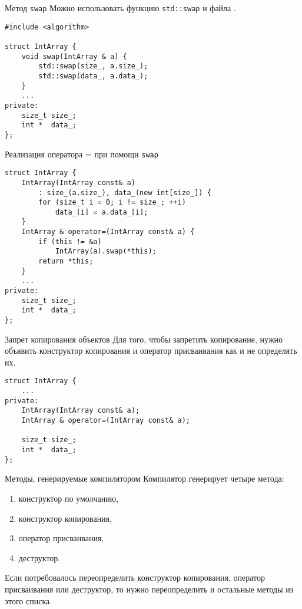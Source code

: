 \documentclass{beamer}
\begin{document}
\begin{frame}[fragile]{Метод {\tt swap}}{}
Можно использовать функцию {\tt std::swap} и файла .
\begin{lstlisting}
#include <algorithm>

struct IntArray {
    void swap(IntArray & a) {
        std::swap(size_, a.size_);
        std::swap(data_, a.data_);
    }
    ...
private:
    size_t size_;
    int *  data_;
};
\end{lstlisting}
\end{frame}

\begin{frame}[fragile]{Реализация оператора = при помощи {\tt swap}}{}
\begin{lstlisting}
struct IntArray {
    IntArray(IntArray const& a) 
        : size_(a.size_), data_(new int[size_]) {
        for (size_t i = 0; i != size_; ++i)
            data_[i] = a.data_[i];    
    }
    IntArray & operator=(IntArray const& a) {
        if (this != &a)
            IntArray(a).swap(*this);
        return *this;
    }
    ...
private:
    size_t size_;
    int *  data_;
};
\end{lstlisting}
\end{frame}

\begin{frame}[fragile]{Запрет копирования объектов}{}
    Для того, чтобы запретить копирование, нужно объявить конструктор копирования
    и оператор присваивания как  и не определять их.
\begin{lstlisting}
struct IntArray {
    ...
private:
    IntArray(IntArray const& a);
    IntArray & operator=(IntArray const& a);

    size_t size_;
    int *  data_;
};
\end{lstlisting}
\end{frame}

\begin{frame}[fragile]{Методы, генерируемые компилятором}{}
    Компилятор генерирует четыре метода:
    \begin{enumerate}
        \item конструктор по умолчанию,
        \item конструктор копирования,
        \item оператор присваивания,
        \item деструктор.
    \end{enumerate}

    Если потребовалось переопределить конструктор копирования,
    оператор присваивания или деструктор, то нужно 
    переопределить и остальные методы из этого списка. 
\end{frame}
\end{document}
